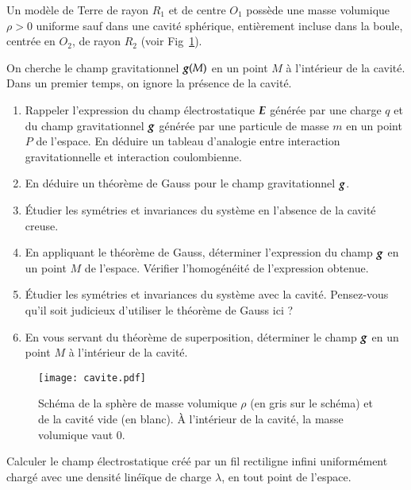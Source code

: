 \begin{exocor}
Un modèle de Terre de rayon $R_1$ et de centre $O_1$ possède une masse volumique 
$\rho>0$ uniforme sauf dans une cavité sphérique, 
entièrement incluse dans la boule, centrée en $O_2$, de rayon $R_2$
(voir Fig~\ref{fig:cavite}). 

On cherche le champ gravitationnel $\vecg(M)$ en un point $M$ 
à l'intérieur de la cavité.
Dans un premier temps, on ignore la présence de la cavité.
\begin{enumerate}
	\item Rappeler l'expression du champ électrostatique $\vece$ générée par une
	  charge $q$ et du champ gravitationnel $\vecg$ générée par une particule
	  de masse $m$ en un point $P$ de l'espace. 
	  En déduire un tableau d'analogie entre interaction
	  gravitationnelle et interaction coulombienne.
  	\item En déduire un théorème de Gauss pour le champ gravitationnel
	  $\vecg$.
	\item Étudier les symétries et invariances du système en l'absence de
	  la cavité creuse.
	\item En appliquant le théorème de Gauss, déterminer l'expression
	  du champ $\vecg$ en un point $M$ de l'espace.
	  Vérifier l'homogénéité de l'expression obtenue.
	\item Étudier les symétries et invariances du système avec la cavité.
	  Pensez-vous qu'il soit judicieux d'utiliser le théorème de Gauss
	  ici ?
	\item En vous servant du théorème de superposition, 
	  déterminer le champ $\vecg$ en un point $M$ à l'intérieur de la cavité.
\end{enumerate}
\end{exocor}
\begin{figure}[h!]
\centering
\texttt{[image: cavite.pdf]}
\caption{Schéma de la sphère de masse volumique $\rho$ (en gris sur le schéma) 
	 et de la cavité vide (en blanc).
         À l'intérieur de la cavité, la masse volumique vaut 0.}
\label{fig:cavite}
\end{figure}

\begin{exocor}
	Calculer le champ électrostatique créé par un fil rectiligne infini
	uniformément chargé avec une densité linéïque de charge $\lambda$, en 
	tout point de l'espace.
\end{exocor}

